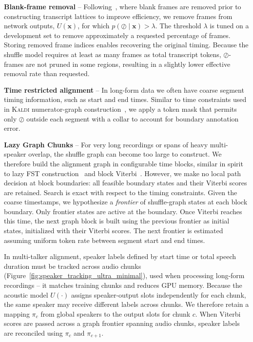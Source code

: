 \textbf{Blank-frame removal} -- Following~\cite{chen2016phone}, where blank frames are removed prior to constructing transcript lattices to improve efficiency, we remove frames from network outputs, $U\left(\mathbf{x}\right)$, for which $p\left(\oslash \mid \mathbf{x}\right)>\lambda$. The threshold $\lambda$ is tuned on a development set to remove approximately a requested percentage of frames. Storing removed frame indices enables recovering the original timing. Because the shuffle model requires at least as many frames as total transcript tokens, $\oslash$-frames are not pruned in some regions, resulting in a slightly lower effective removal rate than requested.
  

\textbf{Time restricted alignment} -- In long-form data we often have coarse segment timing information, such as start and end times. Similar to time constraints used in \textsc{Kaldi} numerator-graph construction~\cite{povey2016purely}, we apply a token mask that permits only $\oslash$ outside each segment with a collar to account for boundary annotation error.
    
\textbf{Lazy Graph Chunks} -- For very long recordings or spans of heavy multi-speaker overlap, the shuffle graph can become too large to construct. We therefore build the alignment graph in configurable time blocks, similar in spirit to lazy FST construction~\cite{mohri2002weighted} and block Viterbi~\cite{kriouile1990algorithme,BOULIANNE199461}. However, we make no local path decision at block boundaries: all feasible boundary states and their Viterbi scores are retained. Search is exact with respect to the timing constraints. Given the coarse timestamps, we hypothesize a \emph{frontier} of shuffle-graph states at each block boundary. Only frontier states are active at the boundary. Once Viterbi reaches this time, the next graph block is built using the previous frontier as initial states, initialized with their Viterbi scores. The next frontier is estimated assuming uniform token rate between segment start and end times.

In multi-talker alignment, speaker labels defined by start time or total speech duration must be tracked across audio chunks (Figure~\ref{fig:speaker_tracking_ultra_minimal}), used when processing long-form recordings -- it matches training chunks and reduces GPU memory. Because the acoustic model $U\left(\cdot\right)$ assigns speaker-output slots independently for each chunk, the same speaker may receive different labels across chunks. We therefore retain a mapping $\pi_c$ from global speakers to the output slots for chunk $c$. When Viterbi scores are passed across a graph frontier spanning audio chunks, speaker labels are reconciled using $\pi_c$ and $\pi_{c+1}$.

